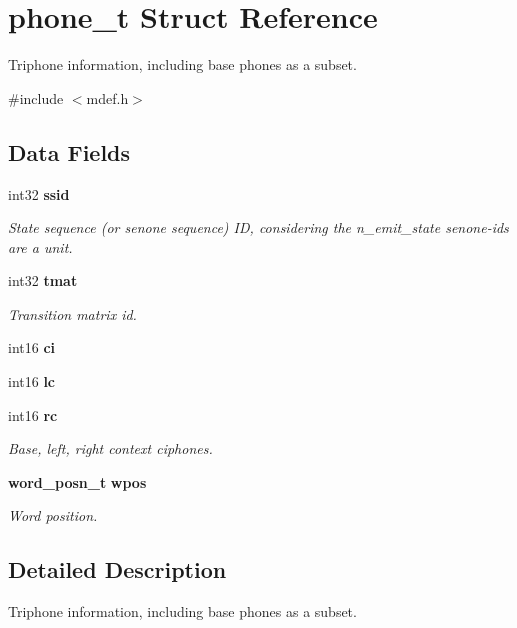 \section{phone\+\_\+t Struct Reference}
\label{structphone__t}


Triphone information, including base phones as a subset.  




{\ttfamily \#include $<$mdef.\+h$>$}

\subsection*{Data Fields}
\begin{DoxyCompactItemize}
\item 
int32 \textbf{ ssid}
\begin{DoxyCompactList}\small\item\em State sequence (or senone sequence) ID, considering the n\+\_\+emit\+\_\+state senone-\/ids are a unit. \end{DoxyCompactList}\item 
\mbox{\label{structphone__t_acbe38b7fc991bfbcb745fb6131d812f0}} 
int32 \textbf{ tmat}
\begin{DoxyCompactList}\small\item\em Transition matrix id. \end{DoxyCompactList}\item 
\mbox{\label{structphone__t_a0a895c57dccac46699fa3589e42b21d5}} 
int16 {\bfseries ci}
\item 
\mbox{\label{structphone__t_a2a473afd43114648de71a9444aa54641}} 
int16 {\bfseries lc}
\item 
\mbox{\label{structphone__t_a334106cbedf3d95a6bdebc4704e028cd}} 
int16 \textbf{ rc}
\begin{DoxyCompactList}\small\item\em Base, left, right context ciphones. \end{DoxyCompactList}\item 
\mbox{\label{structphone__t_a5436db1dd178ef5ead83359c84963c83}} 
\textbf{ word\+\_\+posn\+\_\+t} \textbf{ wpos}
\begin{DoxyCompactList}\small\item\em Word position. \end{DoxyCompactList}\end{DoxyCompactItemize}


\subsection{Detailed Description}
Triphone information, including base phones as a subset. 

